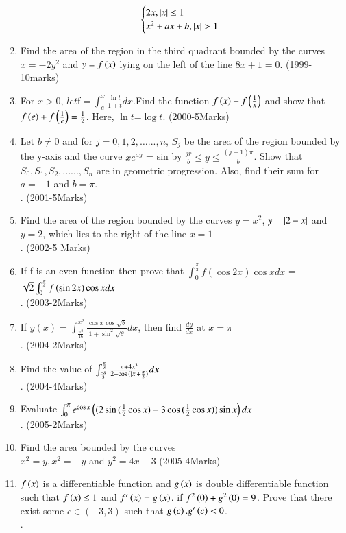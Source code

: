 \documentclass[journal,12pt,twocolumn]{IEEEtran}
\theoremstyle{remark}
\begin{document}
\begin{enumerate}
\begin{align}
\begin{cases}
	2x, \left\vert x\right\vert\le1\\
	x^2+ax+b, \left\vert x\right\vert>1
	\end{cases}
	\end{align}
\item Find the area of the region in the third quadrant bounded by the curves $x=-2y^2$ and $y=f\left(x\right)$ lying on the left of the line $8x+1=0$. 						
\hfill{(1999-10marks)}\\
\item For $x > 0 $, $let $f$=\int_{e}^{x}\frac{\ln{t}}{1+t}dx$.Find the function $f\left(x\right) + f\left(\frac{1}{x}\right)$
 and show that $f\left(e\right)+f\left(\frac{1}{e}\right)=
\frac{1}{2}$. Here, $\ln{t}$=$\log{t}$.
\hfill{(2000-5Marks)}
\item Let $b\neq0$ and for $j=0, 1, 2, \dots{...}, n$, $S_j$ be the area of the region bounded by the y-axis and the curve $xe^{ay}$ = sin by $\frac{jr}{b} \le y \le \frac{(j+1)\pi}{b}$. Show that  $S_0,S_1,S_2,......,S_n$ are in geometric progression. Also, find their sum for $a=-1$ and $b= \pi$. \\.
\hfill{(2001-5Marks)}
\item Find the area of the region bounded by the curves $y=x^2$, $y=\left\vert2-x\right\vert$ and $y=2$, which lies to the right of the line $x=1$\\. 
\hfill{(2002-5 Marks)}
\item If f is an even function then prove that 	$\int_{0}^{\frac{\pi}{2}}f(\cos{2x})\cos{x}dx$ =$\sqrt{2}\int_{0}^{\frac{\pi}{4}}f\left(\sin{2x}\right)\cos{x}dx$\\.
\hfill{(2003-2Marks)}
\item If $y(x)=\int_{\frac{\pi^2}{16}}^{x^2}\frac{\cos{x}\cos{\sqrt{\theta}}}{1+\sin^2{\sqrt{\theta}}}dx$, then find $\frac{dy}{dx}$ at $x=\pi$\\.
\hfill{(2004-2Marks)}
\item  Find the value of $\int_{\frac{-\pi}{3}}^{\frac{\pi}{3}}\frac{\pi+4x^3}{2-\cos{(\left\vert x\right\vert+\frac{\pi}{3})}}dx$\\.
\hfill{(2004-4Marks)}
\item Evaluate $\int_{0}^{\pi}e^{\cos{x}}\left((2\sin{(\frac{1}{2}\cos{x}})+3\cos{(\frac{1}{2}\cos{x})})\sin{x}\right)dx$\\.
\hfill{(2005-2Marks)}
\item Find the area bounded by the curves \\  
$x^2=y,x^2=-y$ and $y^2=4x-3$
\hfill{(2005-4Marks)}
\item  $f\left(x\right)$ is a differentiable function and $g\left(x\right)$ is  double differentiable function such that $f\left(x\right)\le1$ and $f^{\prime}\left(x\right)=g\left(x\right)$. if $f^2\left(0\right)+g^2\left(0\right)=9$. Prove that there exist some $c\in(-3,3)$ such that $g\left(c\right).g^{\prime}\left(c\right)<0$.\\.

\end{enumerate}
\end{document}
